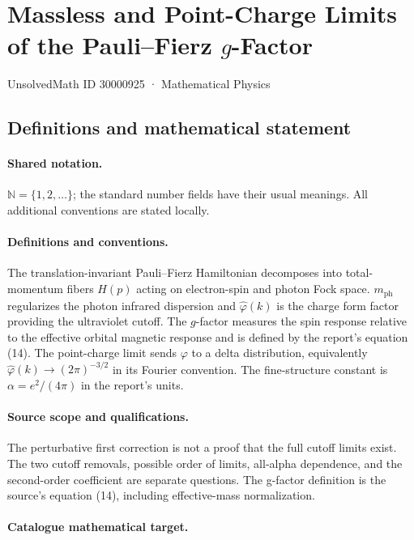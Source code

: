\documentclass[11pt]{article}
\begin{document}
\setcounter{section}{30000924}
\section{Massless and Point-Charge Limits of the Pauli–Fierz $g$-Factor}\label{30000925}
{\small UnsolvedMath ID 30000925 · Mathematical Physics}
\subsection{Definitions and mathematical statement}

\paragraph{Shared notation.}$\mathbb N=\{1,2,\ldots\}$; the standard number fields have their usual meanings. All additional conventions are stated locally.


\paragraph{Definitions and conventions.} The translation-invariant Pauli--Fierz Hamiltonian decomposes into total-momentum fibers $H(p)$ acting on electron-spin and photon Fock space. $m_{\mathrm{ph}}$ regularizes the photon infrared dispersion and $\widehat\varphi(k)$ is the charge form factor providing the ultraviolet cutoff. The $g$-factor measures the spin response relative to the effective orbital magnetic response and is defined by the report's equation (14). The point-charge limit sends $\varphi$ to a delta distribution, equivalently $\widehat\varphi(k)\to(2\pi)^{-3/2}$ in its Fourier convention. The fine-structure constant is $\alpha=e^2/(4\pi)$ in the report's units.

\paragraph{Source scope and qualifications.} The perturbative first correction is not a proof that the full cutoff limits exist. The two cutoff removals, possible order of limits, all-alpha dependence, and the second-order coefficient are separate questions. The g-factor definition is the source's equation (14), including effective-mass normalization.

\paragraph{Catalogue mathematical target.}
\end{document}
